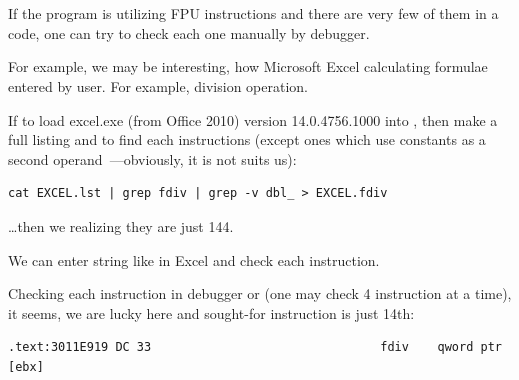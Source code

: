 ﻿\section{}

{If the program is utilizing FPU instructions and there are very few of them in a code,
one can try to check each one manually by debugger.}

{For example, we may be interesting, how Microsoft Excel calculating formulae entered by user.
For example, division operation.}

\index{\GrepUsage}
{If to load excel.exe (from Office 2010) version 14.0.4756.1000 into \IDA, then make a full listing
and to find each \FDIV instructions (except ones which use constants as a second 
operand~---obviously, it is not suits us):}

\begin{lstlisting}
cat EXCEL.lst | grep fdiv | grep -v dbl_ > EXCEL.fdiv
\end{lstlisting}

{\dots then we realizing they are just 144.}

{We can enter string like  in Excel and check each instruction.}

{Checking each instruction in debugger or \tracer
(one may check 4 instruction at a time),
it seems, we are lucky here and sought-for instruction is just 14th:}

\begin{lstlisting}
.text:3011E919 DC 33                                fdiv    qword ptr [ebx]
\end{lstlisting}

